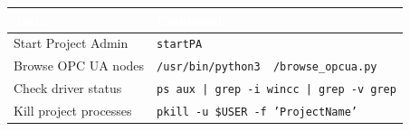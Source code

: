 \documentclass[11pt,a4paper]{article}
\begin{document}
\begin{center}
\begin{tabular}{|l|l|}
\hline
\rowcolor{sectionblue}\textcolor{white}{\textbf{Task}} & \textcolor{white}{\textbf{Command}} \\
\hline
Start Project Admin & \texttt{startPA} \\
\hline
Browse OPC UA nodes & \texttt{/usr/bin/python3 ~/browse\_opcua.py} \\
\hline
Check driver status & \texttt{ps aux | grep -i wincc | grep -v grep} \\
\hline
Kill project processes & \texttt{pkill -u \$USER -f 'ProjectName'} \\
\hline
\end{tabular}
\end{center}
\end{document}
